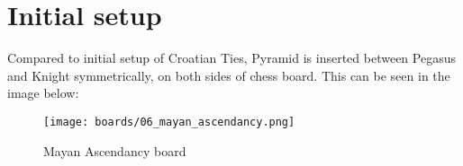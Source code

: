 \clearpage %

\section*{Initial setup}

Compared to initial setup of Croatian Ties, Pyramid is inserted between Pegasus and Knight
symmetrically, on both sides of chess board. This can be seen in the image below:

\noindent
\begin{figure}[h]
\texttt{[image: boards/06\_mayan\_ascendancy.png]}
\caption{Mayan Ascendancy board}
\label{fig:06_mayan_ascendancy}
\end{figure}

\clearpage %

